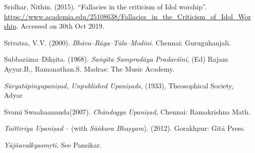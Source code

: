 \begin{thebibliography}{99}
  Sridhar, Nithin. (2015). “Fallacies in the criticism of Idol worship”. \url{https://www.academia.edu/25108638/Fallacies_in_the_Criticism_of_Idol_Worship}. Accessed on 30th Oct 2019.

  Srivatsa, V.V. (2000). \textit{Bhāva–Rāga–Tāla–Modini}. Chennai: Guruguhanjali.

  Subbarāma–Dīkṣita. (1968). \textit{Saṅgīta Sampradāya Pradarśini}, (Ed) Rajam Ayyar.B., Ramanathan.S. Madras: The Music Academy.

  \textit{Sūryatāpinyupaniṣad, Unpublished Upaniṣads,} (1933), Theosophical Society, Adyar

  Svami Swaahaananda(2007).\textit{ Chāndogya Upaniṣad,} Chennai: Rama\-krishna Math.

  \textit{Taittirīya Upaniṣad} – (with \textit{Sāṅkara Bhaṣyam}). (2012). Gorakhpur: Gītā Press.

  \textit{Yājñavalkyasmṛti.} See Pansikar.

 \end{thebibliography}

\theendnotes

